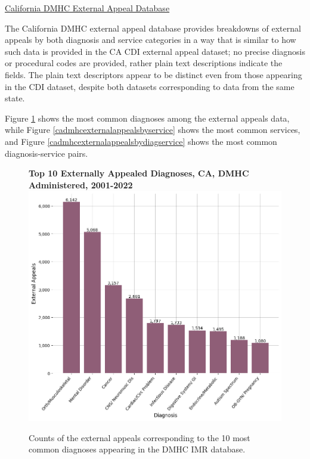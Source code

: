 \documentclass[12pt, a4paper,twoside]{report}
\theoremstyle{plain} %
\theoremstyle{definition} %
\theoremstyle{remark} %
\numberwithin{equation}{chapter}
\begin{document}
		\underline{California DMHC External Appeal Database}
		
		The California DMHC external appeal database provides breakdowns of external appeals by both diagnosis and service categories in a way that is similar to how such data is provided in the CA CDI external appeal dataset; no precise diagnosis or procedural codes are provided, rather plain text descriptions indicate the fields. The plain text descriptors appear to be distinct even from those appearing in the CDI dataset, despite both datasets corresponding to data from the same state.
		
		Figure \ref{cadmhcexternalappealsbydiagnosis} shows the most common diagnoses among the external appeals data, while Figure \ref{cadmhcexternalappealsbyservice} shows the most common services, and Figure \ref{cadmhcexternalappealsbydiagservice} shows the most common diagnosis-service pairs.
		
		\begin{figure}[h!]
			\centering
			\textbf{Top 10 Externally Appealed Diagnoses, CA, DMHC Administered, 2001-2022}
			\includegraphics[width=.8\textwidth]{images/ca_dmhc_external_appeals/top_externally_appealed_diagnoses.png}
			\caption{Counts of the external appeals corresponding to the 10 most common diagnoses appearing in the DMHC IMR database.}
			\label{cadmhcexternalappealsbydiagnosis}
		\end{figure}
		
\end{document}

